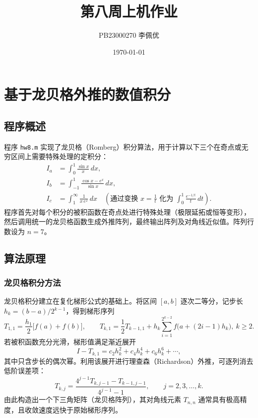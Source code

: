 \documentclass[12pt,a4paper]{article}
\title{第八周上机作业}
\author{PB23000270 李佩优}
\date{\today}
\begin{document}
\maketitle

\section{基于龙贝格外推的数值积分}

\subsection{程序概述}

程序 \texttt{hw8.m} 实现了龙贝格（Romberg）积分算法，用于计算以下三个在奇点或无穷区间上需要特殊处理的定积分：
\[
\begin{aligned}
I_a &= \int_0^1 \frac{\sin x}{x}\,dx,\\[4pt]
I_b &= \int_{-1}^1 \frac{\cos x - e^x}{\sin x}\,dx,\\[4pt]
I_c &= \int_1^\infty \frac{1}{x\,e^{x}}\,dx \quad \left(\text{通过变换 }x=\frac{1}{t}\text{ 化为 }\int_0^1 \frac{e^{-1/t}}{t}\,dt\right).
\end{aligned}
\]
程序首先对每个积分的被积函数在奇点处进行特殊处理（极限延拓或恒等变形），然后调用统一的龙贝格函数生成外推阵列，最终输出阵列及对角线近似值。阵列行数设为 \(n=7\)。

\subsection{算法原理}

\subsubsection{龙贝格积分方法}
龙贝格积分建立在复化梯形公式的基础上。将区间 \([a,b]\) 逐次二等分，记步长 \(h_k = (b-a)/2^{k-1}\)，得到梯形序列
\[
T_{1,1} = \frac{h_1}{2}\bigl[f(a)+f(b)\bigr],\qquad 
T_{k,1} = \frac{1}{2}T_{k-1,1} + h_k\sum_{i=1}^{2^{k-2}} f\bigl(a+(2i-1)h_k\bigr),\ k\ge 2.
\]
若被积函数充分光滑，梯形值满足渐近展开
\[
I - T_{k,1} = c_2 h_k^2 + c_4 h_k^4 + c_6 h_k^6 + \cdots,
\]
其中只含步长的偶次幂。利用该展开进行理查森（Richardson）外推，可逐列消去低阶误差项：
\[
T_{k,j} = \frac{4^{j-1} T_{k,j-1} - T_{k-1,j-1}}{4^{j-1} - 1},\qquad j=2,3,\dots,k.
\]
由此构造出一个下三角矩阵（龙贝格阵列），其对角线元素 \(T_{n,n}\) 通常具有极高精度，且收敛速度远快于原始梯形序列。
\end{document}
